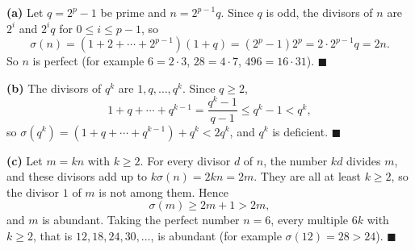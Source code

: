 \textbf{(a)} Let $q=2^p-1$ be prime and $n=2^{p-1}q$. Since $q$ is odd, the divisors of $n$ are $2^i$ and $2^iq$ for $0\le i\le p-1$, so
\[\sigma(n)=\left(1+2+\cdots+2^{p-1}\right)(1+q)=\left(2^p-1\right)2^p=2\cdot2^{p-1}q=2n .\]
So $n$ is perfect (for example $6=2\cdot3$, $28=4\cdot7$, $496=16\cdot31$). $\blacksquare$

\textbf{(b)} The divisors of $q^k$ are $1,q,\ldots,q^k$. Since $q\ge2$,
\[1+q+\cdots+q^{k-1}=\dfrac{q^k-1}{q-1}\le q^k-1<q^k,\]
so $\sigma\left(q^k\right)=\left(1+q+\cdots+q^{k-1}\right)+q^k<2q^k$, and $q^k$ is deficient. $\blacksquare$

\textbf{(c)} Let $m=kn$ with $k\ge2$. For every divisor $d$ of $n$, the number $kd$ divides $m$, and these divisors add up to $k\sigma(n)=2kn=2m$. They are all at least $k\ge2$, so the divisor $1$ of $m$ is not among them. Hence
\[\sigma(m)\ge2m+1>2m,\]
and $m$ is abundant. Taking the perfect number $n=6$, every multiple $6k$ with $k\ge2$, that is $\boxed{12,18,24,30,\ldots}$, is abundant (for example $\sigma(12)=28>24$). $\blacksquare$
